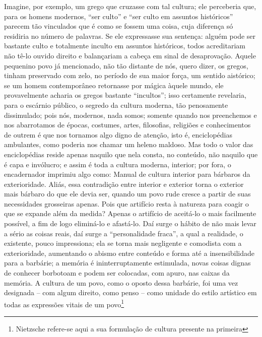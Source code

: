 \begin{enumerate}
    Imagine, por exemplo, um grego que cruzasse com tal cultura; ele
    perceberia que, para os homens modernos, ``ser culto'' e ``ser culto
    em assuntos históricos'' parecem tão vinculados que é como se fossem
    uma coisa, cuja diferença só residiria no número de palavras. Se ele
    expressasse sua sentença: alguém pode ser bastante culto e
    totalmente inculto em assuntos históricos, todos acreditariam não
    tê-lo ouvido direito e balançariam a cabeça em sinal de
    desaprovação. Aquele pequenino povo já mencionado, não tão distante
    de nós, quero dizer, os gregos, tinham preservado com zelo, no
    período de sua maior força, um sentido aistórico; se um homem
    contemporâneo retornasse por mágica àquele mundo, ele provavelmente
    acharia os gregos bastante ``incultos''; isso certamente revelaria,
    para o escárnio público, o segredo da cultura moderna, tão
    penosamente dissimulado; pois nós, modernos, nada somos; somente
    quando nos preenchemos e nos abarrotamos de épocas, costumes, artes,
    filosofias, religiões e conhecimentos de outrem é que nos tornamos
    algo digno de atenção, isto é, enciclopédias ambulantes, como
    poderia nos chamar um heleno maldoso. Mas todo o valor das
    enciclopédias reside apenas naquilo que nela consta, no conteúdo,
    não naquilo que é capa e invólucro; e assim é toda a cultura
    moderna, interior; por fora, o encadernador imprimiu algo como:
    Manual de cultura interior para bárbaros da exterioridade. Aliás,
    essa contradição entre interior e exterior torna o exterior mais
    bárbaro do que ele devia ser, quando um povo rude cresce a partir de
    suas necessidades grosseiras apenas. Pois que artifício resta à
    natureza para coagir o que se expande além da medida? Apenas o
    artifício de aceitá-lo o mais facilmente possível, a fim de logo
    eliminá-lo e afastá-lo. Daí surge o hábito de não mais levar a sério
    as coisas reais, daí surge a ``personalidade fraca'', a qual a
    realidade, o existente, pouco impressiona; ela se torna mais
    negligente e comodista com a exterioridade, aumentando o abismo
    entre conteúdo e forma até a insensibilidade para a barbárie; a
    memória é ininterruptamente estimulada, novas coisas dignas de
    conhecer borbotoam e podem ser colocadas, com apuro, nas caixas da
    memória. A cultura de um povo, como o oposto dessa barbárie, foi uma
    vez designada -- com algum direito, como penso -- como unidade do
    estilo artístico em todas as expressões vitais de um povo\footnote{Nietzsche
      refere-se aqui a sua formulação de cultura presente na primeira
}
\end{enumerate}
